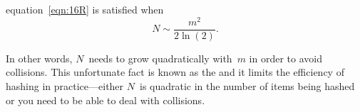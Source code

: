 equation~\eqref{eqn:16R} is satisfied when
\begin{equation}\label{eqn:16S}
    N \sim \frac{m^2}{2 \ln(2)}.
\end{equation}

In other words, $N$~needs to grow quadratically with~$m$ in order to
avoid collisions.  This unfortunate fact is known as the
 and it limits the efficiency of hashing in
practice---either $N$~is quadratic in the number of items being hashed
or you need to be able to deal with collisions.

\fi
